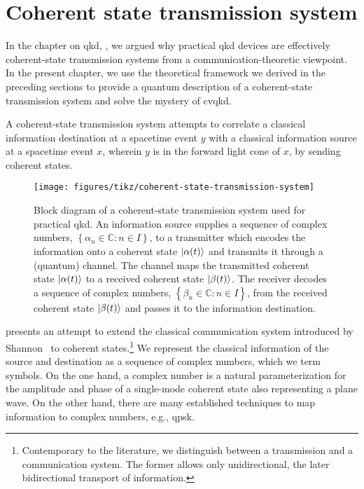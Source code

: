 \chapter{Coherent state transmission system}\label{ch:system}

In the chapter on \gls{qkd}, , we argued why practical \gls{qkd} devices are effectively coherent-state transmission systems from a communication-theoretic viewpoint.
In the present chapter, we use the theoretical framework we derived in the preceding sections to provide a quantum description of a coherent-state transmission system and solve the mystery of \gls{cvqkd}.

A coherent-state transmission system attempts to correlate a classical information destination at a spacetime event $y$ with a classical information source at a spacetime event $x$, wherein $y$ is in the forward light cone of $x$, by sending coherent states.
\begin{figure}[htb]
	\centering
	\texttt{[image: figures/tikz/coherent-state-transmission-system]}
	\caption{Block diagram of a coherent-state transmission system used for practical \gls{qkd}. An information source supplies a sequence of complex numbers, $\left\{\alpha_n\in\mathbb{C}\colon n\in I\right\}$, to a transmitter which encodes the information onto a coherent state $\lvert\alpha(t)\rangle$ and transmits it through a (quantum) channel. The channel maps the transmitted coherent state $\lvert\alpha(t)\rangle$ to a received coherent state $\lvert\beta(t)\rangle$. The receiver decodes a sequence of complex numbers, $\left\{\beta_n\in\mathbb{C}\colon n\in I\right\}$, from the received coherent state $\lvert\beta(t)\rangle$ and passes it to the information destination.}\label{fig:coherent_state_transmission_system}
\end{figure}
 presents an attempt to extend the classical communication system introduced by Shannon~\cite{Shannon1948} to coherent states.\footnote{Contemporary to the literature, we distinguish between a transmission and a communication system. The former allows only unidirectional, the later bidirectional transport of information.}
We represent the classical information of the source and destination as a sequence of complex numbers, which we term symbols.
On the one hand, a complex number is a natural parameterization for the amplitude and phase of a single-mode coherent state also representing a plane wave.
On the other hand, there are many established techniques to map information to complex numbers, e.g., \gls{qpsk}.
